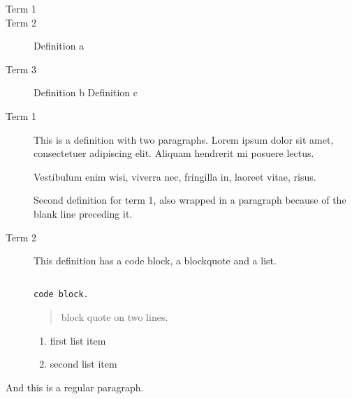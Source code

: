 
\def\mytitle{MultiMarkdown Definition List Test  }

\begin{description}
\item[Term 1
] \item[Term 2
] Definition a\item[Term 3
] 
Definition b
Definition c\item[Term 1
] 

This is a definition with two paragraphs. Lorem ipsum
 dolor sit amet, consectetuer adipiscing elit. Aliquam
 hendrerit mi posuere lectus.

Vestibulum enim wisi, viverra nec, fringilla in, laoreet
vitae, risus.

Second definition for term 1, also wrapped in a paragraph
 because of the blank line preceding it.\item[Term 2
] 

This definition has a code block, a blockquote and a list.

\begin{verbatim}

code block.

\end{verbatim}


\begin{quote}
block quote
on two lines.
\end{quote}
\begin{enumerate}
\item first list item

\item second list item

\end{enumerate}\end{description}


And this is a regular paragraph.




